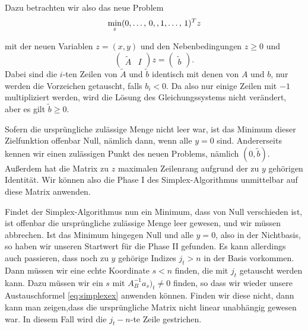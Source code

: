 Dazu betrachten wir also das neue Problem
\begin{equation}
  \min_z (\tikzlabel{xl}0,\ldots,\,0,\tikzlabel{xr},
  \tikzlabel{yl}1,\ldots,\,1\tikzlabel{yr})^Tz
\end{equation}
mit der neuen Variablen $z=(x,y)$ und den Nebenbedingungen $z\ge 0$
und
\begin{equation*}
  \begin{pmatrix}
    \tilde{A} & I 
  \end{pmatrix}
  z =
  \begin{pmatrix}
    \tilde{b}
  \end{pmatrix}.
\end{equation*}
Dabei sind die $i$-ten Zeilen von $\tilde{A}$ und $\tilde{b}$
identisch mit denen von $A$ und $b$, nur werden die Vorzeichen
getauscht, falls $b_i<0$. Da also nur einige Zeilen mit $-1$
multipliziert werden, wird die Lösung des Gleichungssystems nicht
verändert, aber es gilt $\tilde{b}\ge 0$.

Sofern die ursprüngliche zulässige Menge nicht leer war, ist das
Minimum dieser Zielfunktion offenbar Null, nämlich dann, wenn alle
$y=0$ sind. Andererseits kennen wir einen zulässigen Punkt des neuen
Problems, nämlich $(0,\tilde{b})$. Außerdem hat die Matrix zu $z$
maximalen Zeilenrang aufgrund der zu $y$ gehörigen Identität. Wir
können also die Phase I des Simplex-Algorithmus unmittelbar auf diese
Matrix anwenden.

Findet der Simplex-Algorithmus nun ein Minimum, dass von Null
verschieden ist, ist offenbar die ursprüngliche zulässige Menge leer
gewesen, und wir müssen abbrechen. Ist das Minimum hingegen Null und
alle $y=0$, also in der Nichtbasis, so haben wir unseren Startwert für
die Phase II gefunden. Es kann allerdings auch passieren, dass noch zu
$y$ gehörige Indizes $j_t>n$ in der Basis vorkommen. Dann müssen wir
eine echte Koordinate $s<n$ finden, die mit $j_t$ getauscht werden
kann. Dazu müssen wir ein $s$ mit $A_B^{-1}a_s)_t\neq 0$ finden, so
dass wir wieder unsere Austauschformel \eqref{eq:simplexex} anwenden
können. Finden wir diese nicht, dann kann man zeigen,dass die
ursprüngliche Matrix nicht linear unabhängig gewesen war. In diesem
Fall wird die $j_t-n$-te Zeile gestrichen.


